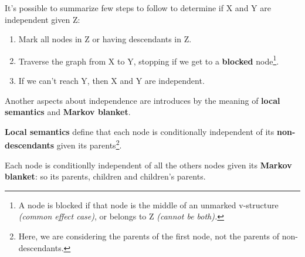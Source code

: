 It's possible to summarize few steps to follow to determine if X and Y are independent given Z:
\begin{enumerate}
    \item Mark all nodes in Z or having descendants in Z.
    \item Traverse the graph from X to Y, stopping if we get to a \textbf{blocked} node\footnote{A node is blocked if that node is the middle of an unmarked v-structure \textit{(common effect case)}, or belongs to Z \textit{(cannot be both).}}.
    \item If we can't reach Y, then X and Y are independent.
\end{enumerate}
Another aspects about independence are introduces by the meaning of \textbf{local semantics} and \textbf{Markov blanket}.
\begin{definition}
    \textbf{Local semantics} define that each node is conditionally independent of its \textbf{non-descendants} given its parents\footnote{Here, we are considering the parents of the first node, not the parents of non-descendants.}. 
\end{definition}
\begin{definition}
    Each node is conditionlly independent of all the others nodes given its \textbf{Markov blanket}: so its parents, children and children's parents.
\end{definition}